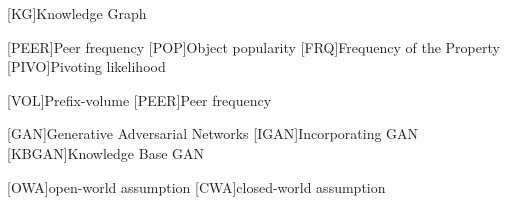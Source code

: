 \begin{acronym}[ECU]

[KG]{Knowledge Graph}


[PEER]{Peer frequency}
[POP]{Object popularity }
[FRQ]{Frequency of the Property}
[PIVO]{Pivoting likelihood}

[VOL]{Prefix-volume}
[PEER]{Peer frequency}

[GAN]{Generative Adversarial Networks}
[IGAN]{Incorporating GAN}
[KBGAN]{Knowledge Base GAN}


[OWA]{open-world assumption}
[CWA]{closed-world assumption}


\end{acronym}
